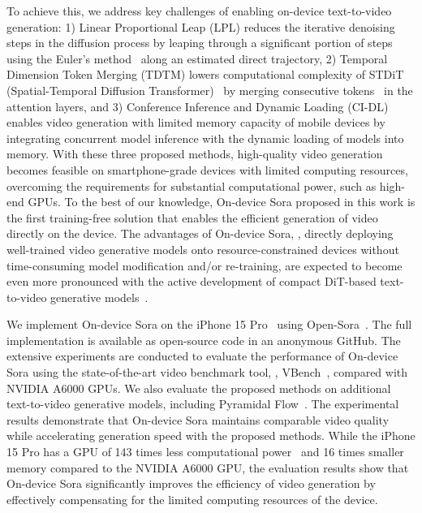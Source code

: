 To achieve this, we address key challenges of enabling on-device text-to-video generation: 1) Linear Proportional Leap (LPL) reduces the iterative denoising steps in the diffusion process by leaping through a significant portion of steps using the Euler’s method~\cite{biswas2013discussion} along an estimated direct trajectory, 2) Temporal Dimension Token Merging (TDTM) lowers computational complexity of STDiT (Spatial-Temporal Diffusion Transformer)~\cite{opensora} by merging consecutive tokens~\cite{bolya2022token,bolya2023token} in the attention layers, and 3) Conference Inference and Dynamic Loading (CI-DL) enables video generation with limited memory capacity of mobile devices by integrating concurrent model inference with the dynamic loading of models into memory. With these three proposed methods, high-quality video generation becomes feasible on smartphone-grade devices with limited computing resources, overcoming the requirements for substantial computational power, such as high-end GPUs. To the best of our knowledge, On-device Sora proposed in this work is the first training-free solution that enables the efficient generation of video directly on the device. The advantages of On-device Sora, \ie, directly deploying well-trained video generative models onto resource-constrained devices without time-consuming model modification and/or re-training, are expected to become even more pronounced with the active development of compact DiT-based text-to-video generative models~\cite{peebles2023scalable}.

We implement On-device Sora on the iPhone 15 Pro~\cite{apple2023} using Open-Sora~\cite{opensora}. The full implementation is available as open-source code in an anonymous GitHub. The extensive experiments are conducted to evaluate the performance of On-device Sora using the state-of-the-art video benchmark tool, \ie, VBench~\cite{huang2024vbench}, compared with NVIDIA A6000 GPUs. We also evaluate the proposed methods on additional text-to-video generative models, including Pyramidal Flow~\cite{jin2024pyramidal}. The experimental results demonstrate that On-device Sora maintains comparable video quality while accelerating generation speed with the proposed methods. While the iPhone 15 Pro has a GPU of 143 times less computational power~\cite{apple2023} and 16 times smaller memory compared to the NVIDIA A6000 GPU, the evaluation results show that On-device Sora significantly improves the efficiency of video generation by effectively compensating for the limited computing resources of the device.



